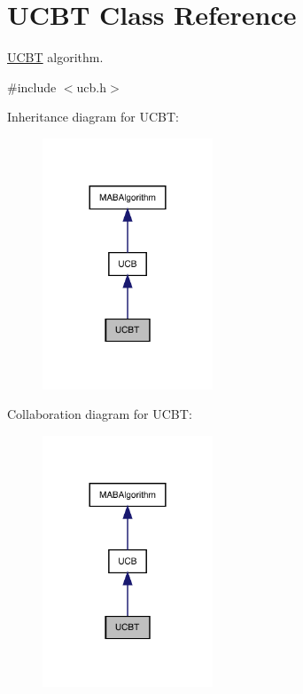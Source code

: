 \hypertarget{class_u_c_b_t}{}\section{U\+C\+BT Class Reference}
\label{class_u_c_b_t}


\mbox{\hyperlink{class_u_c_b_t}{U\+C\+BT}} algorithm.  




{\ttfamily \#include $<$ucb.\+h$>$}



Inheritance diagram for U\+C\+BT\+:
\nopagebreak
\begin{figure}[H]
\begin{center}
\leavevmode
\includegraphics[width=144pt]{class_u_c_b_t__inherit__graph}
\end{center}
\end{figure}


Collaboration diagram for U\+C\+BT\+:
\nopagebreak
\begin{figure}[H]
\begin{center}
\leavevmode
\includegraphics[width=144pt]{class_u_c_b_t__coll__graph}
\end{center}
\end{figure}
